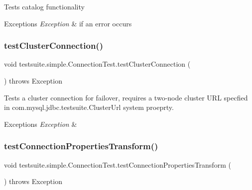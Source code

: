 Tests catalog functionality


\begin{DoxyExceptions}{Exceptions}
{\em Exception} & if an error occurs \\
\hline
\end{DoxyExceptions}
\mbox{\label{classtestsuite_1_1simple_1_1_connection_test_a898cfadb7bf3141e3a364a0d47c824fc}} 
\subsubsection{\texorpdfstring{test\+Cluster\+Connection()}{testClusterConnection()}}
{\footnotesize\ttfamily void testsuite.\+simple.\+Connection\+Test.\+test\+Cluster\+Connection (\begin{DoxyParamCaption}{ }\end{DoxyParamCaption}) throws Exception}

Tests a cluster connection for failover, requires a two-\/node cluster U\+RL specfied in com.\+mysql.\+jdbc.\+testsuite.\+Cluster\+Url system proeprty.


\begin{DoxyExceptions}{Exceptions}
{\em Exception} & \\
\hline
\end{DoxyExceptions}
\mbox{\label{classtestsuite_1_1simple_1_1_connection_test_a77b859fa3de7562ca295047776f563ee}} 
\subsubsection{\texorpdfstring{test\+Connection\+Properties\+Transform()}{testConnectionPropertiesTransform()}}
{\footnotesize\ttfamily void testsuite.\+simple.\+Connection\+Test.\+test\+Connection\+Properties\+Transform (\begin{DoxyParamCaption}{ }\end{DoxyParamCaption}) throws Exception}

